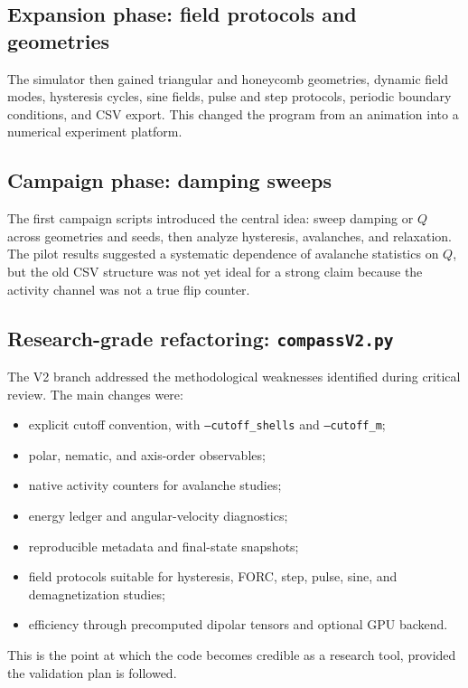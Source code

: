 \documentclass[11pt,a4paper]{article}
\newcommand{\code}[1]{\texttt{#1}}
\begin{document}
\subsection{Expansion phase: field protocols and geometries}

The simulator then gained triangular and honeycomb geometries, dynamic field modes, hysteresis cycles, sine fields, pulse and step protocols, periodic boundary conditions, and CSV export. This changed the program from an animation into a numerical experiment platform.

\subsection{Campaign phase: damping sweeps}

The first campaign scripts introduced the central idea: sweep damping or $Q$ across geometries and seeds, then analyze hysteresis, avalanches, and relaxation. The pilot results suggested a systematic dependence of avalanche statistics on $Q$, but the old CSV structure was not yet ideal for a strong claim because the activity channel was not a true flip counter.

\subsection{Research-grade refactoring: \code{compassV2.py}}

The V2 branch addressed the methodological weaknesses identified during critical review. The main changes were:

\begin{itemize}[leftmargin=*]
\item explicit cutoff convention, with \code{--cutoff\_shells} and \code{--cutoff\_m};
\item polar, nematic, and axis-order observables;
\item native activity counters for avalanche studies;
\item energy ledger and angular-velocity diagnostics;
\item reproducible metadata and final-state snapshots;
\item field protocols suitable for hysteresis, FORC, step, pulse, sine, and demagnetization studies;
\item efficiency through precomputed dipolar tensors and optional GPU backend.
\end{itemize}

This is the point at which the code becomes credible as a research tool, provided the validation plan is followed.
\end{document}
